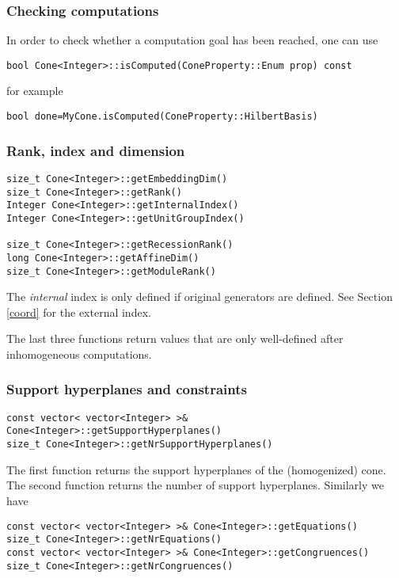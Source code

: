 \documentclass[12pt,a4paper]{scrartcl}
\theoremstyle{definition}
\begin{document}
\begin{small}
\subsubsection{Checking computations}
In order to check whether a computation goal has been reached, one can use
\begin{Verbatim}
bool Cone<Integer>::isComputed(ConeProperty::Enum prop) const 
\end{Verbatim}
for example
\begin{Verbatim}
bool done=MyCone.isComputed(ConeProperty::HilbertBasis)
\end{Verbatim}

\subsubsection{Rank, index and dimension}

\begin{Verbatim}
size_t Cone<Integer>::getEmbeddingDim()
size_t Cone<Integer>::getRank()
Integer Cone<Integer>::getInternalIndex()
Integer Cone<Integer>::getUnitGroupIndex()

size_t Cone<Integer>::getRecessionRank()
long Cone<Integer>::getAffineDim()
size_t Cone<Integer>::getModuleRank()
\end{Verbatim}

The \emph{internal} index is only defined if original generators are defined. See Section \ref{coord} for the external index.

The last three functions return values that are only well-defined after inhomogeneous computations.

\subsubsection{Support hyperplanes and constraints}\label{SHC}

\begin{Verbatim}
const vector< vector<Integer> >& Cone<Integer>::getSupportHyperplanes()
size_t Cone<Integer>::getNrSupportHyperplanes()
\end{Verbatim}

The first function returns the support hyperplanes of the (homogenized) cone.
The second function returns the number of support hyperplanes. Similarly we have

\begin{Verbatim}
const vector< vector<Integer> >& Cone<Integer>::getEquations()
size_t Cone<Integer>::getNrEquations()
const vector< vector<Integer> >& Cone<Integer>::getCongruences()
size_t Cone<Integer>::getNrCongruences()
\end{Verbatim}


\end{small}
\end{document}
